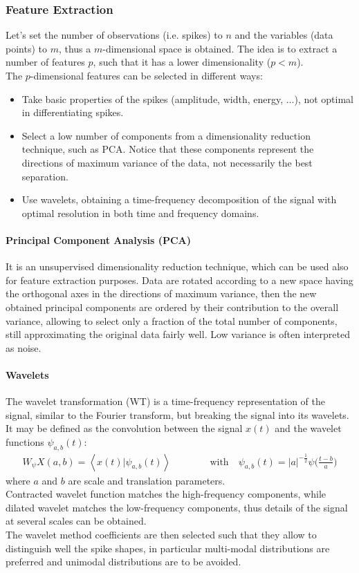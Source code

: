 \subsubsection{Feature Extraction}
Let's set the number of observations (i.e. spikes) to \(n\) and the
variables (data points) to \(m\), thus a \(m\)-dimensional space is obtained.
The idea is to extract a number of features \(p\), such that it has a lower
dimensionality (\(p<m\)).\\
The \(p\)-dimensional features can be selected in different ways:
\begin{itemize}
    \item Take basic properties of the spikes (amplitude, width, energy, ...),
          not optimal in differentiating spikes.
    \item Select a low number of components from a dimensionality reduction
          technique, such as PCA. Notice that these components represent the directions
          of maximum variance of the data, not necessarily the best separation.
    \item Use wavelets, obtaining a time-frequency decomposition of the signal
          with optimal resolution in both time and frequency domains.
\end{itemize}
\paragraph{Principal Component Analysis (PCA)}
It is an unsupervised dimensionality reduction technique, which can be used
also for feature extraction purposes. Data are rotated according to a new space
having the orthogonal axes in the directions of maximum variance, then the new
obtained principal components are ordered by their contribution to the overall
variance, allowing to select only a fraction of the total number of components,
still approximating the original data fairly well. Low variance is often
interpreted as noise.
\paragraph{Wavelets}
The wavelet transformation (WT) is a time-frequency representation of the signal,
similar to the Fourier transform, but breaking the signal into its wavelets.
It may be defined as the convolution between the signal \(x(t)\) and the
wavelet functions \(\psi_{a,b}(t)\):
\begin{align*}
    W_\psi X(a,b)=\left\langle x(t)|\psi_{a,b}(t) \right\rangle
    \quad\quad\quad\quad\text{with}\quad
    \psi_{a,b}(t)=|a|^{-\frac{1}{2}}\psi\biggl(\frac{t-b}{a}\biggr)
\end{align*}
where \(a\) and \(b\) are scale and translation parameters.\\
Contracted wavelet function matches the high-frequency components, while
dilated wavelet matches the low-frequency components, thus details of the signal
at several scales can be obtained.\\
The wavelet method coefficients are then selected such that they allow to
distinguish well the spike shapes, in particular multi-modal distributions
are preferred and unimodal distributions are to be avoided.
